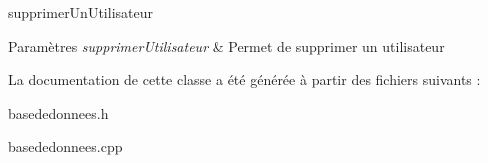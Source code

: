 supprimer\+Un\+Utilisateur 


\begin{DoxyParams}{Paramètres}
{\em supprimer\+Utilisateur} & Permet de supprimer un utilisateur \\
\hline
\end{DoxyParams}


La documentation de cette classe a été générée à partir des fichiers suivants \+:\begin{DoxyCompactItemize}
\item 
basededonnees.\+h\item 
basededonnees.\+cpp\end{DoxyCompactItemize}
